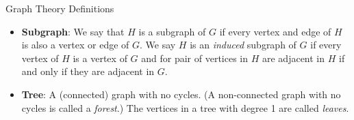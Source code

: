 \documentclass[12pt]{article}
\begin{document}
\begin{defbox}{Graph Theory Definitions}
\begin{itemize}
    \item[] {\bf Subgraph}: We say that $H$ is a subgraph of $G$ if every vertex and edge of $H$ is also a vertex or edge of $G$.  We say $H$ is an {\em induced} subgraph of $G$ if every vertex of $H$ is a vertex of $G$ and for pair of vertices in $H$ are adjacent in $H$ if and only if they are adjacent in $G$.
    \item[] {\bf Tree}: A (connected) graph with no cycles.  (A non-connected graph with no cycles is called a {\em forest}.)  The vertices in a tree with degree 1 are called {\em leaves}.
  \end{itemize}

\end{defbox}
\end{document}
